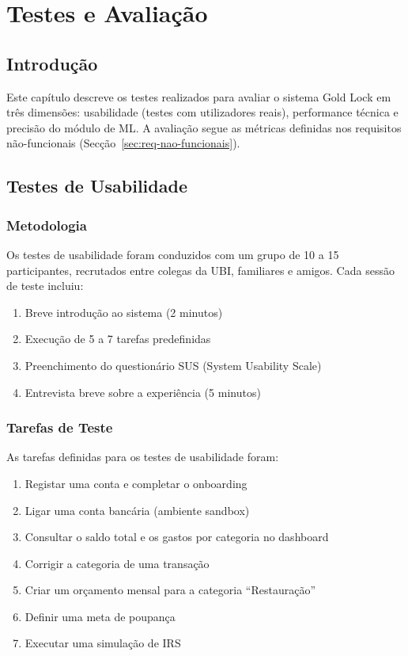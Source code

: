 \chapter{Testes e Avaliação}
\label{chap:testes}

\section{Introdução}
\label{sec:test-intro}

Este capítulo descreve os testes realizados para avaliar o sistema Gold Lock em três dimensões: usabilidade (testes com utilizadores reais), performance técnica e precisão do módulo de \ac{ML}. A avaliação segue as métricas definidas nos requisitos não-funcionais (Secção~\ref{sec:req-nao-funcionais}).



\section{Testes de Usabilidade}
\label{sec:test-usabilidade}

\subsection{Metodologia}

Os testes de usabilidade foram conduzidos com um grupo de 10 a 15 participantes, recrutados entre colegas da \ac{UBI}, familiares e amigos. Cada sessão de teste incluiu:

\begin{enumerate}
    \item Breve introdução ao sistema (2 minutos)
    \item Execução de 5 a 7 tarefas predefinidas
    \item Preenchimento do questionário \ac{SUS} (System Usability Scale)
    \item Entrevista breve sobre a experiência (5 minutos)
\end{enumerate}

\subsection{Tarefas de Teste}

As tarefas definidas para os testes de usabilidade foram:

\begin{enumerate}
    \item Registar uma conta e completar o onboarding
    \item Ligar uma conta bancária (ambiente sandbox)
    \item Consultar o saldo total e os gastos por categoria no dashboard
    \item Corrigir a categoria de uma transação
    \item Criar um orçamento mensal para a categoria ``Restauração''
    \item Definir uma meta de poupança
    \item Executar uma simulação de \ac{IRS}
\end{enumerate}

